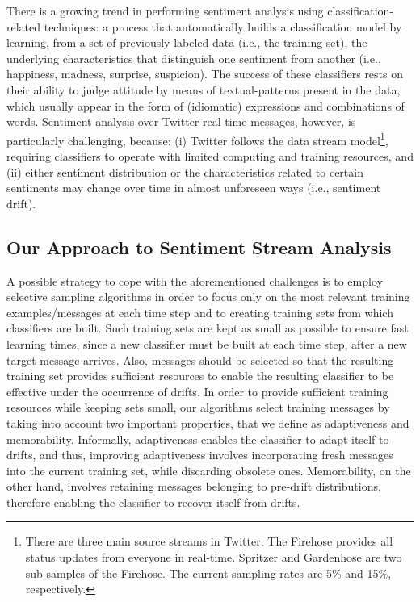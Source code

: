 \documentclass{sig-alternate}
\begin{document}
There is a growing trend in performing sentiment analysis using classification-related techniques: a process that automatically
builds a classification model by learning, from a set of previously
labeled data (i.e., the training-set), the underlying characteristics that distinguish one sentiment from another (i.e., happiness, madness, surprise, suspicion). The success of these classifiers
rests on their ability to judge attitude by means of textual-patterns present in the data, which usually appear in the form
of (idiomatic) expressions and combinations of words.
Sentiment analysis over Twitter real-time messages, however, is particularly challenging, because: (i) Twitter follows the data stream model\footnote{
There are three main source streams in Twitter. The Firehose provides all status updates from everyone in real-time.
Spritzer and Gardenhose are two sub-samples of the Firehose. The current sampling rates are 5\% and 15\%, respectively.},
requiring classifiers to operate with limited computing and training resources, 
and (ii)
either sentiment distribution or the characteristics related to certain sentiments may change over time in almost unforeseen ways (i.e., sentiment drift).

\subsection*{Our Approach to Sentiment Stream Analysis}
A possible strategy to cope with the aforementioned challenges is to employ selective sampling algorithms in order to
focus only on the most relevant training examples/messages at
each time step and to creating training sets from which classifiers are built. Such
training sets are kept as small as possible to ensure fast learning times, since a new classifier must be built at each time step, after a new target message arrives.
Also, messages should be
selected so that the resulting training set
provides sufficient resources to enable the resulting classifier to be effective under the occurrence of drifts.
In order to provide sufficient training resources while keeping sets small, our algorithms select training messages by taking into account two
important properties, that we define as adaptiveness and memorability.
Informally, adaptiveness enables the classifier to adapt
itself to drifts, and thus, improving adaptiveness involves incorporating fresh messages into
the current training set, while discarding obsolete ones. Memorability, on the other hand, involves retaining messages belonging to pre-drift distributions,
therefore enabling the classifier to recover itself from drifts.
\end{document}
